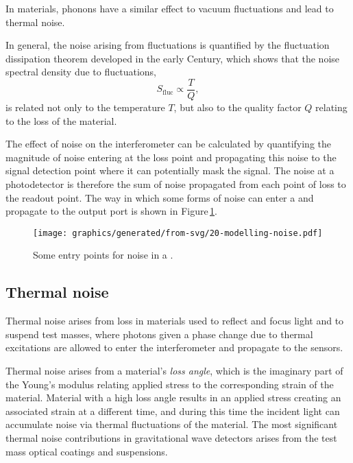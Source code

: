 In materials, phonons  have a similar effect to vacuum fluctuations and lead to thermal noise.

In general, the noise arising from fluctuations is quantified by the fluctuation dissipation theorem developed in the early  Century, which shows that the noise spectral density due to fluctuations,
\begin{equation}
  S_{\text{fluc}} \propto \frac{T}{Q},
\end{equation}
is related not only to the temperature $T$, but also to the quality factor $Q$ relating to the loss of the material.

The effect of noise on the interferometer can be calculated by quantifying the magnitude of noise entering at the loss point and propagating this noise to the signal detection point where it can potentially mask the signal. The noise at a photodetector is therefore the sum of noise propagated from each point of loss to the readout point. The way in which some forms of noise can enter a \MI{} and propagate to the output port is shown in Figure\,\ref{fig:modelling-noise}.

\begin{figure}
  \centering
  \texttt{[image: graphics/generated/from-svg/20-modelling-noise.pdf]}
  \caption[Some entry points for noise in a \MI{}]{\label{fig:modelling-noise}Some entry points for noise in a \MI{}.}
\end{figure}

\subsection{Thermal noise}
Thermal noise arises from loss in materials used to reflect and focus light and to suspend test masses, where photons given a phase change due to thermal excitations are allowed to enter the interferometer and propagate to the sensors.

Thermal noise arises from a material's \emph{loss angle}, which is the imaginary part of the Young's modulus relating applied stress to the corresponding strain of the material. Material with a high loss angle results in an applied stress creating an associated strain at a different time, and during this time the incident light can accumulate noise via thermal fluctuations of the material. The most significant thermal noise contributions in gravitational wave detectors arises from the test mass optical coatings and suspensions.

